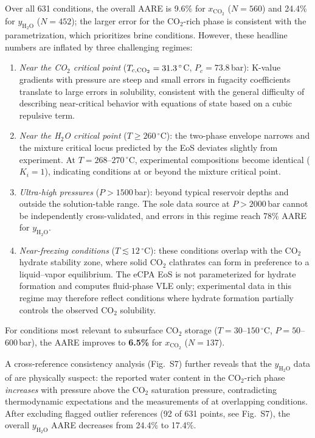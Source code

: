 \documentclass[preprint,12pt,number]{elsarticle}
\begin{document}
Over all 631 conditions, the overall AARE is 9.6\% for $x_{\text{CO}_2}$ ($N = 560$) and
24.4\% for $y_{\text{H}_2\text{O}}$ ($N = 452$); the larger error for the CO$_2$-rich
phase is consistent with the \citet{Coelho2025} parametrization, which prioritizes brine
conditions.
However, these headline numbers are inflated by three challenging regimes:
\begin{enumerate}
  \item \emph{Near the CO$_2$ critical point}
        ($T_{c,{\rm CO_2}} = 31.3\,^\circ$C, $P_c = 73.8$\,bar): K-value gradients with pressure are
        steep and small errors in fugacity coefficients translate to large errors in solubility,
        consistent with the general difficulty of describing near-critical behavior with
        equations of state based on a cubic repulsive term.
  \item \emph{Near the H$_2$O critical point} ($T \geq 260\,^\circ$C): the two-phase envelope
        narrows and the mixture critical locus predicted by the EoS deviates slightly from experiment.
        At $T = 268$--$270\,^\circ$C, experimental compositions become identical ($K_i = 1$), indicating
        conditions at or beyond the mixture critical point.
  \item \emph{Ultra-high pressures} ($P > 1500$\,bar): beyond typical reservoir depths and
        outside the solution-table range.  The sole data source at $P > 2000$\,bar
        \citep{Todheide1963} cannot be independently cross-validated, and errors in this
        regime reach 78\% AARE for $y_{\text{H}_2\text{O}}$.
  \item \emph{Near-freezing conditions} ($T \lesssim 12\,^\circ$C): these conditions overlap
        with the CO$_2$ hydrate stability zone, where solid CO$_2$ clathrates can form in
        preference to a liquid--vapor equilibrium.  The eCPA EoS is not parameterized for
        hydrate formation and computes fluid-phase VLE only; experimental data in this regime
        may therefore reflect conditions where hydrate formation partially controls the
        observed CO$_2$ solubility.
\end{enumerate}
For conditions most relevant to subsurface CO$_2$ storage ($T = 30$--$150\,^\circ$C,
$P = 50$--$600$\,bar), the AARE improves to \textbf{6.5\%} for $x_{\text{CO}_2}$ ($N = 137$).

A cross-reference consistency analysis (Fig.~S7) further reveals
that the $y_{\text{H}_2\text{O}}$ data of \citet{King1992} are physically suspect:
the reported water content in the CO$_2$-rich phase \emph{increases} with pressure above
the CO$_2$ saturation pressure, contradicting thermodynamic expectations and the measurements
of \citet{Meyer2015} at overlapping conditions.
After excluding flagged outlier references (92 of 631 points, see
Fig.~S7), the overall $y_{\text{H}_2\text{O}}$ AARE decreases from
24.4\% to 17.4\%.
\end{document}
